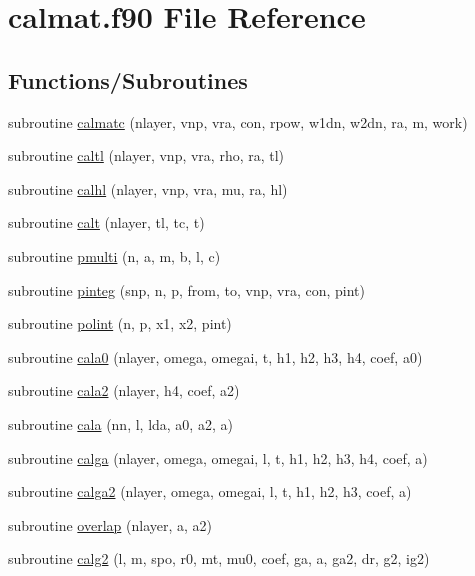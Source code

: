 \hypertarget{calmat_8f90}{\section{calmat.\-f90 File Reference}
\label{calmat_8f90}
}
\subsection*{Functions/\-Subroutines}
\begin{DoxyCompactItemize}
\item 
subroutine \hyperlink{calmat_8f90_ab82715c8a0ce63b45007378c009129be}{calmatc} (nlayer, vnp, vra, con, rpow, w1dn, w2dn, ra, m, work)
\item 
subroutine \hyperlink{calmat_8f90_acb8eafbf308597edcd9469f0516bc0d1}{caltl} (nlayer, vnp, vra, rho, ra, tl)
\item 
subroutine \hyperlink{calmat_8f90_ae16b6b5cf74241a29c390f201b7f8360}{calhl} (nlayer, vnp, vra, mu, ra, hl)
\item 
subroutine \hyperlink{calmat_8f90_a58eafb8aa75e78a8b7740dc574c9a1d6}{calt} (nlayer, tl, tc, t)
\item 
subroutine \hyperlink{calmat_8f90_a728f868a13ca10b648e97198fc88dc13}{pmulti} (n, a, m, b, l, c)
\item 
subroutine \hyperlink{calmat_8f90_acf161e83a5a9f420fbc7441c97ba0ed8}{pinteg} (snp, n, p, from, to, vnp, vra, con, pint)
\item 
subroutine \hyperlink{calmat_8f90_ac0cec2daf6a3c6bb773fd666d4315eed}{polint} (n, p, x1, x2, pint)
\item 
subroutine \hyperlink{calmat_8f90_af1540fed072b3e9ea40a1a0828848dfa}{cala0} (nlayer, omega, omegai, t, h1, h2, h3, h4, coef, a0)
\item 
subroutine \hyperlink{calmat_8f90_a9db250e3b57a0e0dd9fdd1cf2363c369}{cala2} (nlayer, h4, coef, a2)
\item 
subroutine \hyperlink{calmat_8f90_ad294235d050d00dbb77376a363af1ff2}{cala} (nn, l, lda, a0, a2, a)
\item 
subroutine \hyperlink{calmat_8f90_a73f335ef04536f0a3828a72b12b74b75}{calga} (nlayer, omega, omegai, l, t, h1, h2, h3, h4, coef, a)
\item 
subroutine \hyperlink{calmat_8f90_ae6f50427eee218f6ca525d451fa14a9e}{calga2} (nlayer, omega, omegai, l, t, h1, h2, h3, coef, a)
\item 
subroutine \hyperlink{calmat_8f90_ab760228dc7345a420264039541a0fb00}{overlap} (nlayer, a, a2)
\item 
subroutine \hyperlink{calmat_8f90_abfed2e1681026f5127c297d892716a88}{calg2} (l, m, spo, r0, mt, mu0, coef, ga, a, ga2, dr, g2, ig2)
\end{DoxyCompactItemize}


